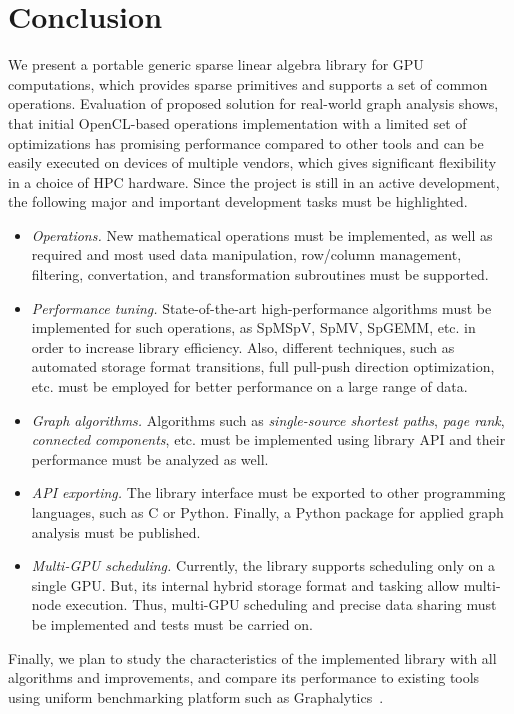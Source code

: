 \section{Conclusion}

We present a portable generic sparse linear algebra library for GPU computations, which provides sparse primitives and supports a set of common operations. Evaluation of proposed solution for real-world graph analysis shows, that initial OpenCL-based operations implementation with a limited set of optimizations has promising performance compared to other tools and can be easily executed on devices of multiple vendors, which gives significant flexibility in a choice of HPC hardware. Since the project is still in an active development, the following major and important development tasks must be highlighted.

\begin{itemize}
    \item \textit{Operations.} New mathematical operations must be implemented, as well as required and most used data manipulation, row/column management, filtering, convertation, and transformation subroutines must be supported.
    
    \item \textit{Performance tuning.} State-of-the-art high-performance algorithms must be implemented for such operations, as SpMSpV, SpMV, SpGEMM, etc. in order to increase library efficiency. Also, different techniques, such as automated storage format transitions, full pull-push direction optimization, etc. must be employed for better performance on a large range of data.
    
    \item \textit{Graph algorithms.} Algorithms such as \textit{single-source shortest paths}, \textit{page rank}, \textit{connected components}, etc. must be implemented using library API and their performance must be analyzed as well. 
    
    \item \textit{API exporting.} The library interface must be exported to other programming languages, such as C or Python. Finally, a Python package for applied graph analysis must be published.
    
    \item \textit{Multi-GPU scheduling.} Currently, the library supports scheduling only on a single GPU. But, its internal hybrid storage format and tasking allow multi-node execution. Thus, multi-GPU scheduling and precise data sharing must be implemented and tests must be carried on.
\end{itemize}

Finally, we plan to study the characteristics of the implemented library with all algorithms and improvements, and compare its performance to existing tools using uniform benchmarking platform such as Graphalytics~\cite{Graphalytics:iosup2021ldbc}. 